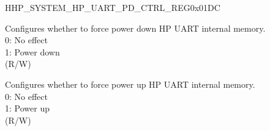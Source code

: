 \begin{register}{H}{HP\_SYSTEM\_HP\_UART\_PD\_CTRL\_REG}{0x01DC}\label{regdesc:HPSYSTEMHPUARTPDCTRLREG}
%
%
%
\regnewline%
\begin{regdesc}\begin{reglist}
\label{fielddesc:HPSYSTEMUARTMEMFORCEPD}\item [HP\_SYSTEM\_UART\_MEM\_FORCE\_PD] Configures whether to force power down HP UART internal memory.\\
0: No effect\\
1: Power down\\
(R/W)
\label{fielddesc:HPSYSTEMUARTMEMFORCEPU}\item [HP\_SYSTEM\_UART\_MEM\_FORCE\_PU] Configures whether to force power up HP UART internal memory.\\
0: No effect\\
1: Power up\\
(R/W)
\end{reglist}\end{regdesc}
\end{register}


